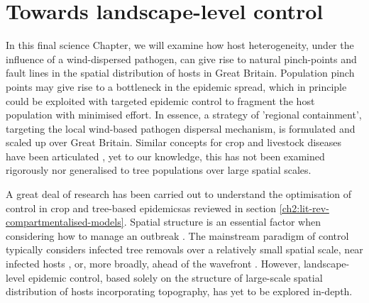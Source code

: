 
\chapter{Towards landscape-level control}


\label{ch7:landscape-level-control}

In this final science Chapter, we will examine how host heterogeneity, under the influence of a wind-dispersed pathogen, 
can give rise to natural pinch-points and fault lines in the spatial distribution of hosts in Great Britain. 
Population pinch points may give rise to a bottleneck in the epidemic spread, which in principle could be exploited with targeted epidemic control to fragment the host population with minimised effort. 
In essence, a strategy of 'regional containment', targeting the local wind-based pathogen dispersal mechanism, 
is formulated and scaled up over Great Britain.
Similar concepts for crop and livestock diseases have been articulated \cite{PAPAIX201435, GILIOLI20131, Gilligan-disease-management}, yet to our knowledge, this has not been examined rigorously nor generalised to tree populations over large spatial scales.

A great deal of research has been carried out to understand the optimisation of control in crop and tree-based epidemics\textemdash as reviewed in section \ref{ch2:lit-rev-compartmentalised-models}. 
Spatial structure is an essential factor when considering how to manage an outbreak \cite{spatial-control-optimisation, control-heterogeneous-landscapes}. 
The mainstream paradigm of control typically considers infected tree removals over a relatively small spatial scale, near infected hosts \cite{WEBIDEMICS}, or, more broadly, ahead of the wavefront \cite{large-scale-control}. 
However, landscape-level epidemic control, based solely on the structure of large-scale spatial distribution of hosts incorporating topography, has yet to be explored in-depth.

